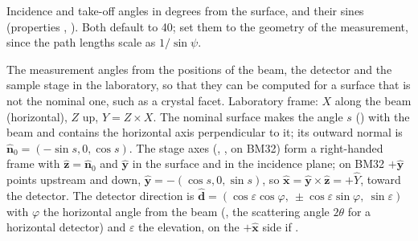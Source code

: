 Incidence and take-off angles in degrees from the surface, and their sines (properties
, ). Both default to 40\textdegree; set them to the geometry of the
measurement, since the path lengths scale as $1/\sin\psi$.

The measurement angles from the positions of the beam, the detector and the sample stage in the
laboratory, so that they can be computed for a surface that is not the nominal one, such as a
crystal facet. Laboratory frame: $X$ along the beam (horizontal), $Z$ up, $Y = Z\times X$. The
nominal surface makes the angle $s$ () with the beam and contains the
horizontal axis perpendicular to it; its outward normal is $\hat{\mathbf n}_0 = (-\sin s, 0,
\cos s)$. The stage axes (, ,  on BM32) form a right-handed frame
with $\hat{\mathbf z} = \hat{\mathbf n}_0$ and $\hat{\mathbf y}$ in the surface and in the
incidence plane; on BM32 $+\hat{\mathbf y}$ points upstream and down,
$\hat{\mathbf y} = -(\cos s, 0, \sin s)$, so $\hat{\mathbf x} = \hat{\mathbf y}\times\hat{\mathbf z}
= +\hat Y$, toward the detector. The detector direction is
$\hat{\mathbf d} = (\cos\varepsilon\cos\varphi,\ \pm\cos\varepsilon\sin\varphi,\ \sin\varepsilon)$
with $\varphi$ the horizontal angle from the beam (, the scattering
angle $2\theta$ for a horizontal detector) and $\varepsilon$ the elevation, on the
$+\hat{\mathbf x}$ side if .

